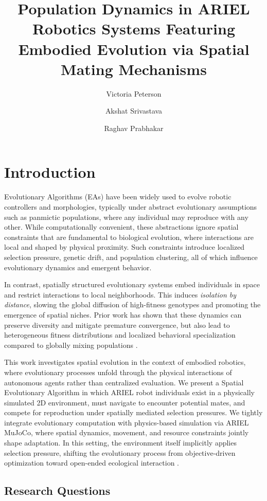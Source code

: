 \documentclass[dvipsnames,format=sigconf,anonymous=false,review=false]{acmart}
\title{Population Dynamics in ARIEL Robotics Systems Featuring Embodied Evolution via Spatial Mating Mechanisms}
\author{Victoria Peterson}
\affiliation{%
  \institution{Vrije Universiteit}
  \city{Amsterdam}
  \country{Netherlands}
}
\author{Akshat Srivastava}
\affiliation{%
  \institution{Vrije Universiteit}
  \city{Amsterdam}
  \country{Netherlands}
}
\author{Raghav Prabhakar}
\affiliation{%
  \institution{Vrije Universiteit}
  \city{Amsterdam}
  \country{Netherlands}
}
\begin{document}
\maketitle

\section{Introduction}
Evolutionary Algorithms (EAs) have been widely used to evolve robotic controllers and morphologies, typically under abstract evolutionary assumptions such as panmictic populations, where any individual may reproduce with any other. While computationally convenient, these abstractions ignore spatial constraints that are fundamental to biological evolution, where interactions are local and shaped by physical proximity. Such constraints introduce localized selection pressure, genetic drift, and population clustering, all of which influence evolutionary dynamics and emergent behavior.

In contrast, spatially structured evolutionary systems embed individuals in space and restrict interactions to local neighborhoods. This induces \emph{isolation by distance}, slowing the global diffusion of high-fitness genotypes and promoting the emergence of spatial niches. Prior work has shown that these dynamics can preserve diversity and mitigate premature convergence, but also lead to heterogeneous fitness distributions and localized behavioral specialization compared to globally mixing populations \cite{chopard_parallel_2000, pappa_genetic_2023}.

This work investigates spatial evolution in the context of embodied robotics, where evolutionary processes unfold through the physical interactions of autonomous agents rather than centralized evaluation. We present a Spatial Evolutionary Algorithm in which ARIEL robot individuals exist in a physically simulated 2D environment, must navigate to encounter potential mates, and compete for reproduction under spatially mediated selection pressures. We tightly integrate evolutionary computation with physics-based simulation via ARIEL MuJoCo, where spatial dynamics, movement, and resource constraints jointly shape adaptation. In this setting, the environment itself implicitly applies selection pressure, shifting the evolutionary process from objective-driven optimization toward open-ended ecological interaction \cite{doncieux_new_2011, bredeche_environment-driven_2012, bredeche_embodied_2018}.


\subsection*{Research Questions}
\end{document}
